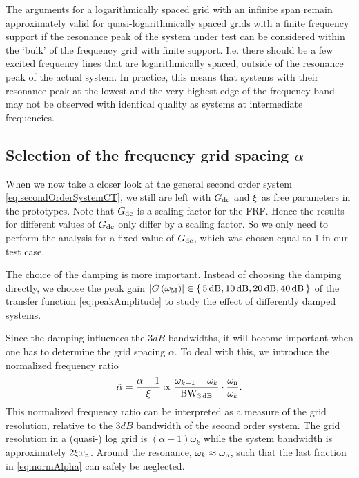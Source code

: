   The arguments for a logarithmically spaced grid with an infinite span remain approximately valid for quasi-logarithmically spaced grids with a finite frequency support if the resonance peak of the system under test can be considered within the `bulk' of the frequency grid with finite support.
  I.e. there should be a few excited frequency lines that are logarithmically spaced, outside of the resonance peak of the actual system.
  In practice, this means that systems with their resonance peak at the lowest and the very highest edge of the frequency band may not be observed with identical quality as systems at intermediate frequencies.

  \subsection{Selection of the frequency grid spacing $\alpha$}
  When we now take a closer look at the general second order system \eqref{eq:secondOrderSystemCT}, we still are left with $G_{\mathrm{dc}}$ and $\xi$ as free parameters in the prototypes.
  Note that $G_{\mathrm{dc}}$ is a scaling factor for the FRF.
  Hence the results for different values of $G_{\mathrm{dc}}$ only differ by a scaling factor.
  So we only need to perform the analysis for a fixed value of $G_{\mathrm{dc}}$, which was chosen equal to $1$ in our test case.

  The choice of the damping is more important.
  Instead of choosing the damping directly, we choose the peak gain $\left| G\left( \omega_{\mathrm{M}} \right) \right| \in \set{5 \ensuremath{\,\mathrm{dB}}, 10 \ensuremath{\,\mathrm{dB}}, 20 \ensuremath{\,\mathrm{dB}}, 40 \ensuremath{\,\mathrm{dB}} }$ of the transfer function \eqref{eq:peakAmplitude} to study the effect of differently damped systems.

  Since the damping influences the $3\unit{dB}$ bandwidths, it will become important when one has to determine the grid spacing $\alpha$.
  To deal with this, we introduce the normalized frequency ratio
  \begin{equation}
    \tilde{\alpha} = \frac{\alpha - 1}
                          {\xi}
                   \propto \frac{\omega_{k+1} - \omega_k}
                                {\mathrm{BW}_{3\,\mathrm{dB}}}
                           \cdot
                           \frac{\omega_{\mathrm{n}}}{\omega_k}
    \text{.}
    \label{eq:normAlpha} 
  \end{equation}
  This normalized frequency ratio can be interpreted as a measure of the grid resolution, relative to the $3\unit{dB}$ bandwidth of the second order system.
  The grid resolution in a (quasi-) log grid is $\left( \alpha - 1\right)\omega_k$ while the system bandwidth is approximately $2\xi\omega_{\mathrm{n}}$.
  Around the resonance, $\omega_k \approx \omega_{\mathrm{n}}$, such that the last fraction in \eqref{eq:normAlpha} can safely be neglected.
  
